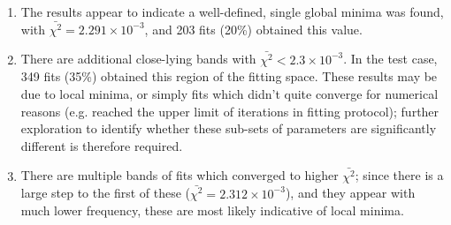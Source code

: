 \begin{enumerate}
\item The results appear to indicate a well-defined, single global minima was found, with $\bar{\chi^2} = 2.291\times10^{-3}$, and 203 fits (20\%) obtained this value.
\item There are additional close-lying bands with $\bar{\chi^2} < 2.3\times10^{-3}$. In the test case, 349 fits (35\%) obtained this region of the fitting space. These results may be due to local minima, or simply fits which didn't quite converge for numerical reasons (e.g. reached the upper limit of iterations in fitting protocol); further exploration to identify whether these sub-sets of parameters are significantly different is therefore required.
\item There are multiple bands of fits which converged to higher $\bar{\chi^2}$; since there is a large step to the first of these ($\bar{\chi^2} = 2.312\times10^{-3}$), and they appear with much lower frequency, these are most likely indicative of local minima.

\end{enumerate}


